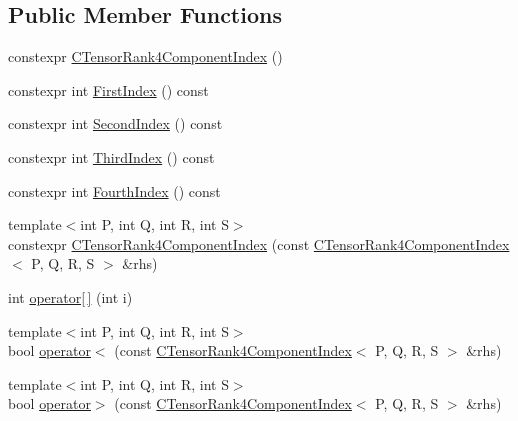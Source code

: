\subsection*{Public Member Functions}
\begin{DoxyCompactItemize}
\item 
constexpr \mbox{\hyperlink{classmpc_1_1core_1_1_c_tensor_rank4_component_index_aeaca64a48e159b69fe5a31df70ad2f32}{C\+Tensor\+Rank4\+Component\+Index}} ()
\item 
constexpr int \mbox{\hyperlink{classmpc_1_1core_1_1_c_tensor_rank4_component_index_a85051cd05a5c3e0cb7d277118b2ec2c3}{First\+Index}} () const
\item 
constexpr int \mbox{\hyperlink{classmpc_1_1core_1_1_c_tensor_rank4_component_index_ad1904a0c34a510646edf7f02f8a43eb2}{Second\+Index}} () const
\item 
constexpr int \mbox{\hyperlink{classmpc_1_1core_1_1_c_tensor_rank4_component_index_aaa4260a643cbcf4064ed18a419ade063}{Third\+Index}} () const
\item 
constexpr int \mbox{\hyperlink{classmpc_1_1core_1_1_c_tensor_rank4_component_index_a8eb34d3c33fcf838cb74994696786032}{Fourth\+Index}} () const
\item 
{\footnotesize template$<$int P, int Q, int R, int S$>$ }\\constexpr \mbox{\hyperlink{classmpc_1_1core_1_1_c_tensor_rank4_component_index_a04ed4e32ff536bfda855d15e87d3310c}{C\+Tensor\+Rank4\+Component\+Index}} (const \mbox{\hyperlink{classmpc_1_1core_1_1_c_tensor_rank4_component_index}{C\+Tensor\+Rank4\+Component\+Index}}$<$ P, Q, R, S $>$ \&rhs)
\item 
int \mbox{\hyperlink{classmpc_1_1core_1_1_c_tensor_rank4_component_index_a7553f47e436776486fa6775308ee7c9f}{operator\mbox{[}$\,$\mbox{]}}} (int i)
\item 
{\footnotesize template$<$int P, int Q, int R, int S$>$ }\\bool \mbox{\hyperlink{classmpc_1_1core_1_1_c_tensor_rank4_component_index_a97d2a6a2cc3c49e1fb4a6849d26e5c5d}{operator$<$}} (const \mbox{\hyperlink{classmpc_1_1core_1_1_c_tensor_rank4_component_index}{C\+Tensor\+Rank4\+Component\+Index}}$<$ P, Q, R, S $>$ \&rhs)
\item 
{\footnotesize template$<$int P, int Q, int R, int S$>$ }\\bool \mbox{\hyperlink{classmpc_1_1core_1_1_c_tensor_rank4_component_index_ad15773f0dd7b0e1e766c91fd79ab3d8d}{operator$>$}} (const \mbox{\hyperlink{classmpc_1_1core_1_1_c_tensor_rank4_component_index}{C\+Tensor\+Rank4\+Component\+Index}}$<$ P, Q, R, S $>$ \&rhs)

\end{DoxyCompactItemize}
